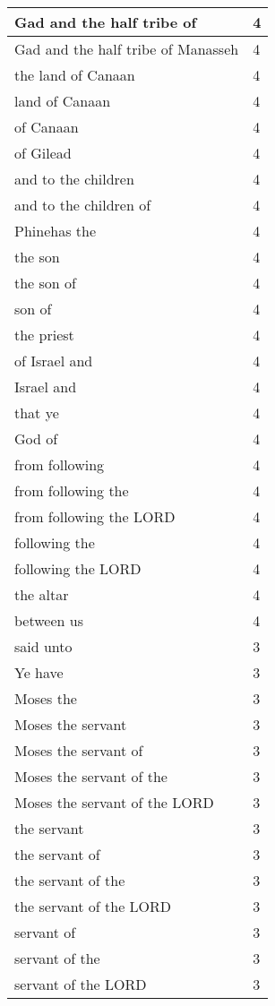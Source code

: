 \begin{center}
\begin{longtable}{|p{3.0in}|p{0.5in}|}
Gad and the half tribe of & 4\\ \hline 
Gad and the half tribe of Manasseh & 4\\ \hline 
the land of Canaan & 4\\ \hline 
land of Canaan & 4\\ \hline 
of Canaan & 4\\ \hline 
of Gilead & 4\\ \hline 
and to the children & 4\\ \hline 
and to the children of & 4\\ \hline 
Phinehas the & 4\\ \hline 
the son & 4\\ \hline 
the son of & 4\\ \hline 
son of & 4\\ \hline 
the priest & 4\\ \hline 
of Israel and & 4\\ \hline 
Israel and & 4\\ \hline 
that ye & 4\\ \hline 
God of & 4\\ \hline 
from following & 4\\ \hline 
from following the & 4\\ \hline 
from following the LORD & 4\\ \hline 
following the & 4\\ \hline 
following the LORD & 4\\ \hline 
the altar & 4\\ \hline 
between us & 4\\ \hline 
said unto & 3\\ \hline 
Ye have & 3\\ \hline 
Moses the & 3\\ \hline 
Moses the servant & 3\\ \hline 
Moses the servant of & 3\\ \hline 
Moses the servant of the & 3\\ \hline 
Moses the servant of the LORD & 3\\ \hline 
the servant & 3\\ \hline 
the servant of & 3\\ \hline 
the servant of the & 3\\ \hline 
the servant of the LORD & 3\\ \hline 
servant of & 3\\ \hline 
servant of the & 3\\ \hline 
servant of the LORD & 3\\ \hline 

\end{longtable}
\end{center}
